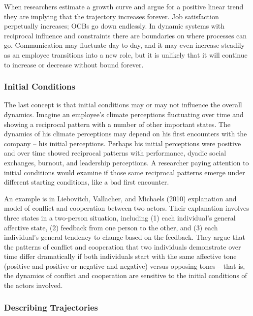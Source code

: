 \documentclass[english,,man]{apa6}
\theoremstyle{definition}
\theoremstyle{definition}
\theoremstyle{definition}
\theoremstyle{remark}
\begin{document}
When researchers estimate a growth curve and argue for a positive linear
trend they are implying that the trajectory increases forever. Job
satisfaction perpetually increases; OCBs go down endlessly. In dynamic
systems with reciprocal influence and constraints there are boundaries
on where processes can go. Communication may fluctuate day to day, and
it may even increase steadily as an employee transitions into a new
role, but it is unlikely that it will continue to increase or decrease
without bound forever.

\hypertarget{initial-conditions}{%
\subsubsection{Initial Conditions}\label{initial-conditions}}

The last concept is that initial conditions may or may not influence the
overall dynamics. Imagine an employee's climate perceptions fluctuating
over time and showing a reciprocal pattern with a number of other
important states. The dynamics of his climate perceptions may depend on
his first encounters with the company -- his initial perceptions.
Perhaps his initial perceptions were positive and over time showed
reciprocal patterns with performance, dyadic social exchanges, burnout,
and leadership perceptions. A researcher paying attention to initial
conditions would examine if those same reciprocal patterns emerge under
different starting conditions, like a bad first encounter.

An example is in Liebovitch, Vallacher, and Michaels (2010) explanation
and model of conflict and cooperation between two actors. Their
explanation involves three states in a two-person situation, including
(1) each individual's general affective state, (2) feedback from one
person to the other, and (3) each individual's general tendency to
change based on the feedback. They argue that the patterns of conflict
and cooperation that two individuals demonstrate over time differ
dramatically if both individuals start with the same affective tone
(positive and positive or negative and negative) versus opposing tones
-- that is, the dynamics of conflict and cooperation are sensitive to
the initial conditions of the actors involved.

\hypertarget{describing-trajectories}{%
\subsubsection{Describing Trajectories}\label{describing-trajectories}}
\end{document}
